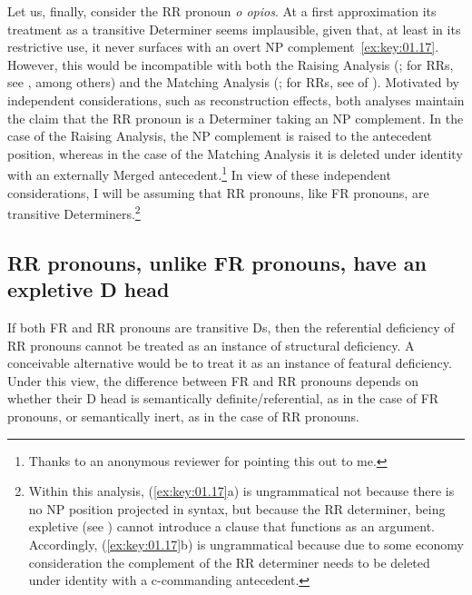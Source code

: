 \documentclass[output=paper]{langsci/langscibook}
\begin{document}
Let us, finally, consider the \gls{RR} pronoun \emph{o opios}. At a first
approximation its treatment as a transitive Determiner seems implausible, given
that, at least in its restrictive use, it never surfaces with an overt NP
complement~\eqref{ex:key:01.17}. However, this would be incompatible with both
the Raising Analysis (\citealt{Kayne1994}; for  \glspl{RR}, see
\citealt{AleAna2000}, among others) and the Matching Analysis
(\citealt{Sauerland1998}; for  \glspl{RR}, see \citealt{KotzVar2005}
of ). Motivated by independent considerations, such as
reconstruction effects, both analyses maintain the claim that the \gls{RR}
pronoun is a Determiner taking an NP complement. In the case of the Raising
Analysis, the NP complement is raised to the antecedent position, whereas in
the case of the Matching Analysis it is deleted under identity with an
externally Merged antecedent.\footnote{Thanks to an anonymous reviewer for
    pointing this out to me.} In view of these independent considerations, I
    will be assuming that \gls{RR} pronouns, like \gls{FR} pronouns, are
    transitive Determiners.\footnote{Within this analysis,
        (\ref{ex:key:01.17}a) is ungrammatical not because there is no NP
        position projected in syntax, but because the \gls{RR} determiner,
        being expletive (see ) cannot introduce a clause
        that functions as an argument. Accordingly, (\ref{ex:key:01.17}b) is
    ungrammatical because due to some economy consideration the complement of
the \gls{RR} determiner needs to be deleted under identity with a c-commanding
antecedent.}

\subsection{RR pronouns, unlike FR pronouns, have an expletive D head}\label{sub:key:01.4.3}

If both \gls{FR} and \gls{RR} pronouns are transitive Ds, then the referential
deficiency of \gls{RR} pronouns cannot be treated as an instance of structural
deficiency. A conceivable alternative would be to treat it as an instance of
featural deficiency. Under this view, the difference between \gls{FR} and
\gls{RR} pronouns depends on whether their D head is semantically
definite/referential, as in the case of \gls{FR} pronouns, or semantically
inert, as in the case of \gls{RR} pronouns.
\end{document}
